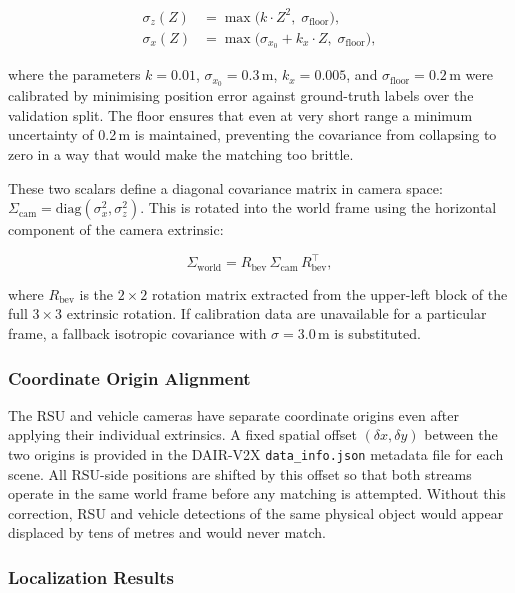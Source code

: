 \documentclass[12pt]{article}
\begin{document}
\begin{align}
    \sigma_z(Z) &= \max\!\bigl(k \cdot Z^2,\;\sigma_{\text{floor}}\bigr),
    \label{eq:sigma_z}\\[4pt]
    \sigma_x(Z) &= \max\!\bigl(\sigma_{x_0} + k_x \cdot Z,\;
                   \sigma_{\text{floor}}\bigr),
    \label{eq:sigma_x}
\end{align}
 
\noindent where the parameters $k = 0.01$, $\sigma_{x_0} = 0.3$\,m,
$k_x = 0.005$, and $\sigma_{\text{floor}} = 0.2$\,m were calibrated
by minimising position error against ground-truth labels over the
validation split. The floor ensures that even at very short range a
minimum uncertainty of 0.2\,m is maintained, preventing the covariance
from collapsing to zero in a way that would make the matching too
brittle.
 
\medskip
These two scalars define a diagonal covariance matrix in camera space:
$\Sigma_{\text{cam}} = \mathrm{diag}(\sigma_x^2, \sigma_z^2)$. This is
rotated into the world frame using the horizontal component of the
camera extrinsic:
 
\begin{equation}
    \Sigma_{\text{world}} =
        R_{\text{bev}}\,\Sigma_{\text{cam}}\,R_{\text{bev}}^{\top},
    \label{eq:cov_world}
\end{equation}
 
\noindent where $R_{\text{bev}}$ is the $2{\times}2$ rotation matrix
extracted from the upper-left block of the full $3{\times}3$ extrinsic
rotation. If calibration data are unavailable for a particular frame, a
fallback isotropic covariance with $\sigma = 3.0$\,m is substituted.
 
\subsubsection*{Coordinate Origin Alignment}
 
The RSU and vehicle cameras have separate coordinate origins even after
applying their individual extrinsics. A fixed spatial offset
$(\delta x, \delta y)$ between the two origins is provided in the
DAIR-V2X \texttt{data\_info.json} metadata file for each scene. All
RSU-side positions are shifted by this offset so that both streams
operate in the same world frame before any matching is attempted. Without
this correction, RSU and vehicle detections of the same physical object
would appear displaced by tens of metres and would never match.
 
\subsubsection*{Localization Results}
 
\end{document}
